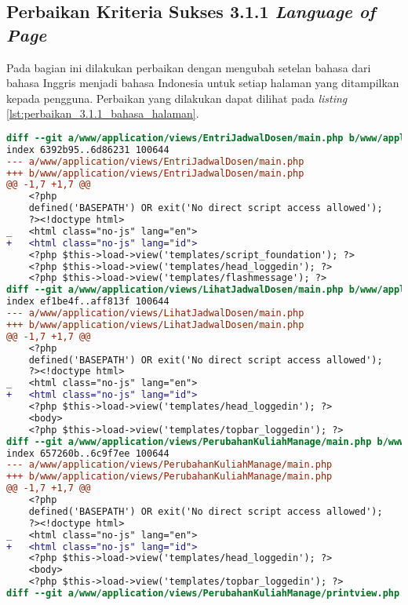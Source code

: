 \subsection{Perbaikan Kriteria Sukses 3.1.1 \textit{Language of Page}}
\label{subsec:perbaikan_kriteria_sukses_3.1.1}
Pada bagian ini dilakukan perbaikan dengan mengubah setelan bahasa dari bahasa Inggris menjadi bahasa Indonesia untuk setiap halaman yang ditampilkan kepada pengguna. Perbaikan yang dilakukan dapat dilihat pada \textit{listing} \ref{lst:perbaikan_3.1.1_bahasa_halaman}.

\begin{lstlisting}[frame=single, label={lst:perbaikan_3.1.1_bahasa_halaman}, language=diff, caption=Perbaikan Kriteria Sukses 3.1.1]
diff --git a/www/application/views/EntriJadwalDosen/main.php b/www/application/views/EntriJadwalDosen/main.php
index 6392b95..6d86231 100644
--- a/www/application/views/EntriJadwalDosen/main.php
+++ b/www/application/views/EntriJadwalDosen/main.php
@@ -1,7 +1,7 @@
    <?php
    defined('BASEPATH') OR exit('No direct script access allowed');
    ?><!doctype html>
_   <html class="no-js" lang="en">
+   <html class="no-js" lang="id">
    <?php $this->load->view('templates/script_foundation'); ?>
    <?php $this->load->view('templates/head_loggedin'); ?>
    <?php $this->load->view('templates/flashmessage'); ?>
diff --git a/www/application/views/LihatJadwalDosen/main.php b/www/application/views/LihatJadwalDosen/main.php
index ef1be4f..aff813f 100644
--- a/www/application/views/LihatJadwalDosen/main.php
+++ b/www/application/views/LihatJadwalDosen/main.php
@@ -1,7 +1,7 @@
    <?php
    defined('BASEPATH') OR exit('No direct script access allowed');
    ?><!doctype html>
_   <html class="no-js" lang="en">
+   <html class="no-js" lang="id">
    <?php $this->load->view('templates/head_loggedin'); ?>
    <body>
    <?php $this->load->view('templates/topbar_loggedin'); ?>
diff --git a/www/application/views/PerubahanKuliahManage/main.php b/www/application/views/PerubahanKuliahManage/main.php
index 657260b..6c9f7ee 100644
--- a/www/application/views/PerubahanKuliahManage/main.php
+++ b/www/application/views/PerubahanKuliahManage/main.php
@@ -1,7 +1,7 @@
    <?php
    defined('BASEPATH') OR exit('No direct script access allowed');
    ?><!doctype html>
_   <html class="no-js" lang="en">
+   <html class="no-js" lang="id">
    <?php $this->load->view('templates/head_loggedin'); ?>
    <body>
    <?php $this->load->view('templates/topbar_loggedin'); ?>
diff --git a/www/application/views/PerubahanKuliahManage/printview.php b/www/application/views/PerubahanKuliahManage/printview.php

\end{lstlisting}
